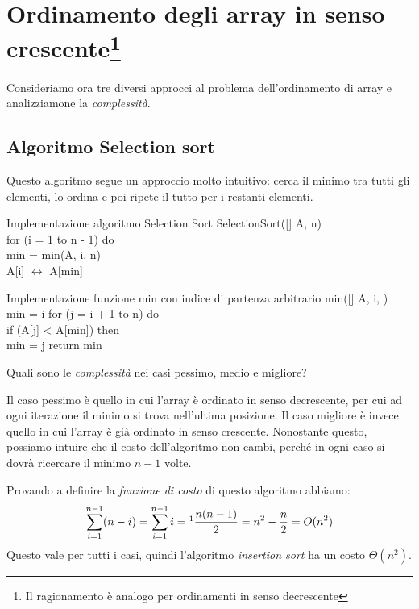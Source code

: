 \section[Ordinamento degli array in senso crescente]
{Ordinamento degli array in senso crescente\footnote{Il ragionamento è
analogo per ordinamenti in senso decrescente}}
Consideriamo ora tre diversi approcci al problema dell'ordinamento di array e
analizziamone la \emph{complessità}.

\subsection{Algoritmo Selection sort}
Questo algoritmo segue un approccio molto intuitivo: cerca il minimo tra tutti gli
elementi, lo ordina e poi ripete il tutto per i restanti elementi.

\begin{code}{Implementazione algoritmo Selection Sort}
\noindent\rmbreak SelectionSort([] A,  n)\\
    \ind for (i = 1 to n - 1) do\\
        \indf{} min = min(A, i, n)\\
        \indf A[i] $\leftrightarrow$ A[min]\hfill{}    
\end{code}
\vspace{-2\lineheight}
\begin{code}{Implementazione funzione min con indice di partenza arbitrario}
\noindent\rmbreak\ind{} min([] A,  i, )\\
     min = i\hfill{}
    for (j = i + 1 to n) do\\
        \indf if (A[j] < A[min]) then\\
            \indff min = j\hfill{}
    \ind return min
\end{code}\noindent
Quali sono le \emph{complessità} nei casi pessimo, medio e migliore?

\bigskip\noindent
Il caso pessimo è quello in cui l'array è ordinato in senso decrescente,
per cui ad ogni iterazione il minimo si trova nell'ultima posizione.
Il caso migliore è invece quello in cui l'array è già ordinato in senso crescente.
Nonostante questo, possiamo intuire che il costo dell'algoritmo non cambi, perché
in ogni caso si dovrà ricercare il minimo $n-1$ volte.

\bigskip\noindent
Provando a definire la \emph{funzione di costo} di questo algoritmo abbiamo:
\[\sum_{i=1}^{n-1}(n-i)=\sum_{i=1}^{n-1}i=\footnotemark\frac{n(n-1)}
{2}=n^2-\frac{n}{2}=O(n^2)\]
Questo vale per tutti i casi, quindi l'algoritmo \emph{insertion sort} ha un
costo $\Theta(n^2)$.


